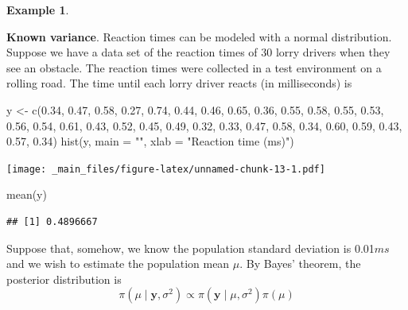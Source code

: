 \documentclass[
]{book}
\newenvironment{Shaded}{\begin{snugshade}}{\end{snugshade}}
\newcommand{\AttributeTok}[1]{\textcolor[rgb]{0.77,0.63,0.00}{#1}}
\newcommand{\FloatTok}[1]{\textcolor[rgb]{0.00,0.00,0.81}{#1}}
\newcommand{\FunctionTok}[1]{\textcolor[rgb]{0.00,0.00,0.00}{#1}}
\newcommand{\NormalTok}[1]{#1}
\newcommand{\OtherTok}[1]{\textcolor[rgb]{0.56,0.35,0.01}{#1}}
\newcommand{\StringTok}[1]{\textcolor[rgb]{0.31,0.60,0.02}{#1}}
\theoremstyle{definition}
\theoremstyle{definition}
\newtheorem{example}{Example}[chapter]
\theoremstyle{definition}
\theoremstyle{definition}
\theoremstyle{remark}
\begin{document}
\begin{example}
\protect\hypertarget{exm:normal}{}\label{exm:normal}

\textbf{Known variance}. Reaction times can be modeled with a normal distribution. Suppose we have a data set of the reaction times of 30 lorry drivers when they see an obstacle. The reaction times were collected in a test environment on a rolling road. The time until each lorry driver reacts (in milliseconds) is

\begin{Shaded}
\begin{Highlighting}[]
\NormalTok{y }\OtherTok{\textless{}{-}} \FunctionTok{c}\NormalTok{(}\FloatTok{0.34}\NormalTok{, }\FloatTok{0.47}\NormalTok{, }\FloatTok{0.58}\NormalTok{, }\FloatTok{0.27}\NormalTok{, }\FloatTok{0.74}\NormalTok{, }\FloatTok{0.44}\NormalTok{, }\FloatTok{0.46}\NormalTok{, }\FloatTok{0.65}\NormalTok{, }\FloatTok{0.36}\NormalTok{, }\FloatTok{0.55}\NormalTok{, }\FloatTok{0.58}\NormalTok{, }\FloatTok{0.55}\NormalTok{, }\FloatTok{0.53}\NormalTok{, }\FloatTok{0.56}\NormalTok{, }\FloatTok{0.54}\NormalTok{, }\FloatTok{0.61}\NormalTok{, }\FloatTok{0.43}\NormalTok{, }\FloatTok{0.52}\NormalTok{, }\FloatTok{0.45}\NormalTok{, }\FloatTok{0.49}\NormalTok{, }\FloatTok{0.32}\NormalTok{, }\FloatTok{0.33}\NormalTok{, }\FloatTok{0.47}\NormalTok{, }\FloatTok{0.58}\NormalTok{, }\FloatTok{0.34}\NormalTok{, }\FloatTok{0.60}\NormalTok{, }\FloatTok{0.59}\NormalTok{, }\FloatTok{0.43}\NormalTok{, }\FloatTok{0.57}\NormalTok{, }\FloatTok{0.34}\NormalTok{)}
\FunctionTok{hist}\NormalTok{(y, }\AttributeTok{main =} \StringTok{""}\NormalTok{, }\AttributeTok{xlab =} \StringTok{"Reaction time (ms)"}\NormalTok{)}
\end{Highlighting}
\end{Shaded}

\texttt{[image: \_main\_files/figure-latex/unnamed-chunk-13-1.pdf]}

\begin{Shaded}
\begin{Highlighting}[]
\FunctionTok{mean}\NormalTok{(y)}
\end{Highlighting}
\end{Shaded}

\begin{verbatim}
## [1] 0.4896667
\end{verbatim}

Suppose that, somehow, we know the population standard deviation is 0.01\(ms\) and we wish to estimate the population mean \(\mu\). By Bayes' theorem, the posterior distribution is
\[
\pi(\mu \mid \boldsymbol{y}, \sigma^2) \propto \pi(\boldsymbol{y} \mid \mu, \sigma^2) \pi(\mu)
\]


\end{example}
\end{document}
